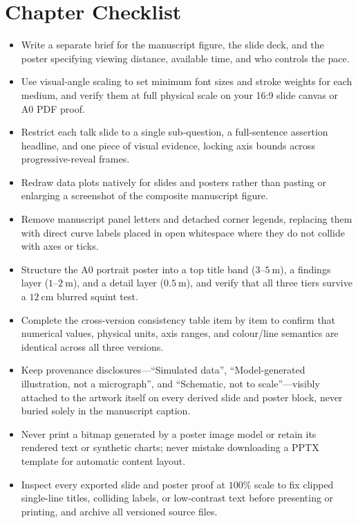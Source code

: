 \section{Chapter Checklist}

\begin{itemize}
\item Write a separate brief for the manuscript figure, the slide deck, and the poster specifying viewing distance, available time, and who controls the pace.
\item Use visual-angle scaling to set minimum font sizes and stroke weights for each medium, and verify them at full physical scale on your 16:9 slide canvas or A0 PDF proof.
\item Restrict each talk slide to a single sub-question, a full-sentence assertion headline, and one piece of visual evidence, locking axis bounds across progressive-reveal frames.
\item Redraw data plots natively for slides and posters rather than pasting or enlarging a screenshot of the composite manuscript figure.
\item Remove manuscript panel letters and detached corner legends, replacing them with direct curve labels placed in open whitespace where they do not collide with axes or ticks.
\item Structure the A0 portrait poster into a top title band ($3\text{--}5\ \text{m}$), a findings layer ($1\text{--}2\ \text{m}$), and a detail layer ($0.5\ \text{m}$), and verify that all three tiers survive a $12\ \text{cm}$ blurred squint test.
\item Complete the cross-version consistency table item by item to confirm that numerical values, physical units, axis ranges, and colour/line semantics are identical across all three versions.
\item Keep provenance disclosures---``Simulated data'', ``Model-generated illustration, not a micrograph'', and ``Schematic, not to scale''---visibly attached to the artwork itself on every derived slide and poster block, never buried solely in the manuscript caption.
\item Never print a bitmap generated by a poster image model or retain its rendered text or synthetic charts; never mistake downloading a PPTX template for automatic content layout.
\item Inspect every exported slide and poster proof at $100\%$ scale to fix clipped single-line titles, colliding labels, or low-contrast text before presenting or printing, and archive all versioned source files.
\end{itemize}

